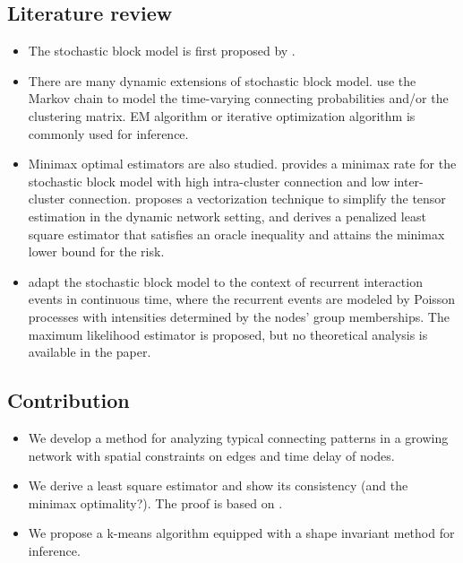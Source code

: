 \subsection*{Literature review}

\begin{itemize}
	\item The stochastic block model is first proposed by \citet{Wang1987}.
	\item There are many dynamic extensions of stochastic block model. 
	\citet{Yang2011,Xu2014a,Matias2016,Xu2015} use the Markov chain to model the time-varying  connecting probabilities and/or the clustering matrix. 
	EM algorithm or iterative optimization algorithm is commonly used for inference.
	\item Minimax optimal estimators are also studied.
	\citet{Gao2015a} provides a minimax rate for the stochastic block model with high intra-cluster connection and low inter-cluster connection.
	\citet{Pensky2019a} proposes a vectorization technique to simplify the tensor estimation in the dynamic network setting, and derives a penalized least square estimator that satisfies an oracle inequality and  attains the minimax lower bound for the risk.
	\item \citet{Matias2018} adapt the stochastic block model to the context of recurrent interaction events in continuous time, 
	where the recurrent events are modeled by Poisson processes with intensities determined by the nodes' group memberships. 
	The maximum likelihood estimator is proposed, but no theoretical analysis is available in the paper. 


\end{itemize}



\subsection*{Contribution}
\begin{itemize}
	\item We develop a method for analyzing typical connecting patterns in a growing network with spatial constraints on edges and time delay of nodes.

	\item We derive a least square estimator and show its consistency (and the minimax optimality?). 
	The proof is based on \citet{Gao2015a}.

	\item We propose a k-means algorithm equipped with a shape invariant method for inference.


\end{itemize}


